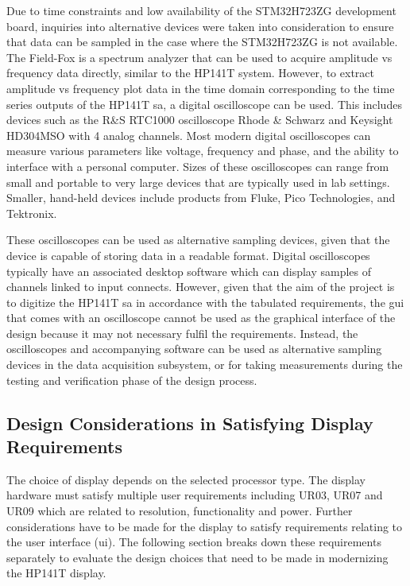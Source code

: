 \documentclass[class=report,11pt,crop=false]{standalone}
\begin{document}
	Due to time constraints and low availability of the STM32H723ZG development board, inquiries into alternative devices were taken into consideration to ensure that data can be sampled in the case where the STM32H723ZG is not available. The Field-Fox is a spectrum analyzer that can be used to acquire amplitude vs frequency data directly, similar to the HP141T system. However, to extract amplitude vs frequency plot data in the time domain corresponding to the time series outputs of the HP141T \acrshort{sa}, a digital oscilloscope can be used. This includes devices such as the R\&S RTC1000 oscilloscope Rhode \& Schwarz and Keysight HD304MSO with 4 analog channels. Most modern digital oscilloscopes can measure various parameters like voltage, frequency and phase, and the ability to interface with a personal computer. Sizes of these oscilloscopes can range from small and portable to very large devices that are typically used in lab settings. Smaller, hand-held devices include products from Fluke, Pico Technologies, and Tektronix. 
	
	These oscilloscopes can be used as alternative sampling devices, given that the device is capable of storing data in a readable format. Digital oscilloscopes typically have an associated desktop software which can display samples of channels linked to input connects. However, given that the aim of the project is to digitize the HP141T \acrshort{sa} in accordance with the tabulated requirements, the \acrshort{gui} that comes with an oscilloscope cannot be used as the graphical interface of the design because it may not necessary fulfil the requirements. Instead, the oscilloscopes and accompanying software can be used as alternative sampling devices in the data acquisition subsystem, or for taking measurements during the testing and verification phase of the design process. 
	
	\subsection{Design Considerations in Satisfying Display Requirements}
	
	The choice of display depends on the selected processor type. The display hardware must satisfy multiple user requirements including UR03, UR07 and UR09 which are related to resolution, functionality and power. Further considerations have to be made for the display to satisfy requirements relating to the user interface (\acrshort{ui}). The following section breaks down these requirements separately to evaluate the design choices that need to be made in modernizing the HP141T display.
	
\end{document}
